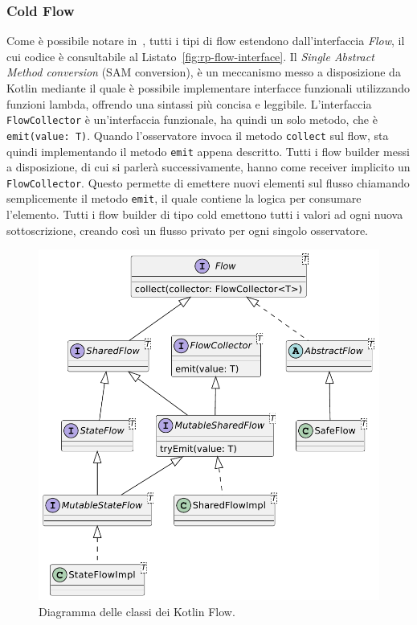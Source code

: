 \documentclass[12pt,a4paper,openright,twoside]{book}
\begin{document}
\subsubsection{Cold Flow}
\label{sec:cold-flow}
Come è possibile notare in~, tutti i tipi di flow estendono dall'interfaccia \textit{Flow}, il cui codice è consultabile al Listato~\ref{fig:rp-flow-interface}.
Il \textit{Single Abstract Method conversion} (SAM conversion), è un meccanismo messo a disposizione da Kotlin mediante il quale è possibile implementare interfacce funzionali utilizzando funzioni lambda, offrendo una sintassi più concisa e leggibile.  
L'interfaccia \texttt{FlowCollector} è un'interfaccia funzionale, ha quindi un solo metodo, che è \texttt{emit(value: T)}. 
Quando l'osservatore invoca il metodo \texttt{collect} sul flow, sta quindi implementando il metodo \texttt{emit} appena descritto. 
Tutti i flow builder messi a disposizione, di cui si parlerà successivamente, hanno come receiver implicito un \texttt{FlowCollector}. Questo permette di emettere nuovi elementi sul flusso chiamando semplicemente il metodo \texttt{emit}, il quale contiene la logica per consumare l'elemento.
Tutti i flow builder di tipo cold emettono tutti i valori ad ogni nuova sottoscrizione, creando così un flusso privato per ogni singolo osservatore.  



\begin{figure}
    \centering
    \includegraphics[width=.80\linewidth]{figures/reactive-programming/flow-class-diagram.pdf}
    \caption{Diagramma delle classi dei Kotlin Flow.}
    \label{fig:rp-flow-class-diagram}
\end{figure}
\end{document}
